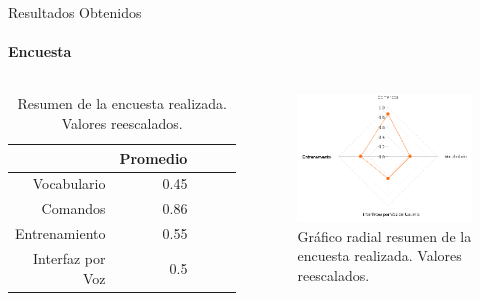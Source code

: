 \begin{frame}{Resultados Obtenidos}
\framesubtitle{Encuesta}
\begin{columns}
\begin{table}[H] 
\centering
\tiny
\begin{tabular}{|r|r|r|r|r|}
\hline
            & Promedio \\
\hline
Vocabulario    & 0.45 \\
Comandos    & 0.86 \\
Entrenamiento  & 0.55 \\
Interfaz por Voz & 0.5 \\
\hline
\end{tabular}
\caption{Resumen de la encuesta realizada. Valores reescalados.}
\label{sec:tabla-encuesta-normalizada}
\end{table}
\begin{figure}[ht]
\centering
\includegraphics[width=1\linewidth]{./graphics/kiviat.png}
\caption{Gr\'afico radial resumen de la encuesta realizada. Valores reescalados.}
\label{figure:kiviat-encuesta2}
\end{figure}
\end{columns}
\end{frame}